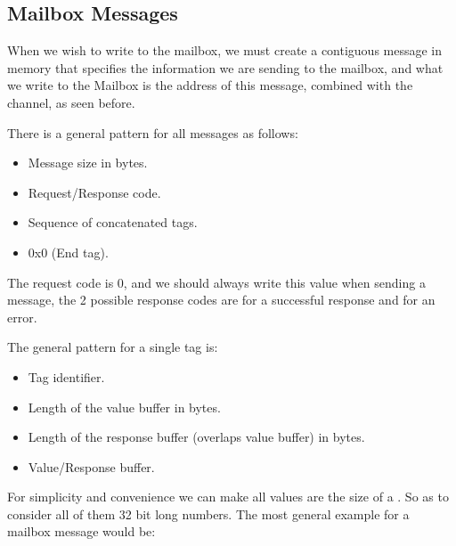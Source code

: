 \documentclass[12pt, svgnames]{book}
\begin{document}
\subsection{Mailbox Messages}

When we wish to write to the mailbox, we must create a contiguous message in memory that specifies the information we are sending to the mailbox, and what we write to the Mailbox is the address of this message, combined with the channel, as seen before.

There is a general pattern for all messages as follows:
\begin{itemize}
	\item Message size in bytes.
	\item Request/Response code.
	\item Sequence of concatenated tags.
	\item 0x0 (End tag).
\end{itemize}

The request code is 0, and we should always write this value when sending a message, the 2 possible response codes are  for a successful response and  for an error.

The general pattern for a single tag is:

\begin{itemize}
	\item Tag identifier.
	\item Length of the value buffer in bytes.
	\item Length of the response buffer (overlaps value buffer) in bytes.
	\item Value/Response buffer.
\end{itemize}

For simplicity and convenience we can make all values are the size of a . So as to consider all of them 32 bit long numbers. The most general example for a mailbox message would be:
\end{document}
